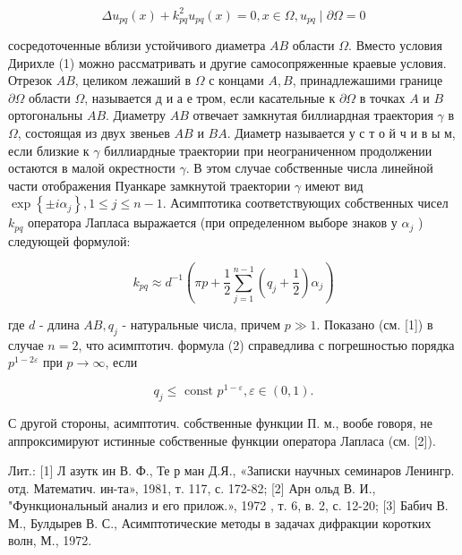 \documentclass[10pt]{article}
\begin{document}
\[

\Delta u_{p q}(x)+k_{p q}^{2} u_{p q}(x)=0, x \in \Omega, u_{p q} \mid \partial \Omega=0

\]



сосредоточенные вблизи устойчивого диаметра $A B$ области $\Omega$. Вместо условия Дирихле (1) можно рассматривать и другие самосопряженные краевые условия. Отрезок $A B$, целиком лежаший в $\Omega$ с концами $A, B$, принадлежашими границе $\partial \Omega$ области $\Omega$, называется д и а е тром, если касательные к $\partial \Omega$ в точках $A$ и $B$ ортогональны $A B$. Диаметру $A B$ отвечает замкнутая биллиардная траектория $\gamma$ в $\Omega$, состоящая из двух звеньев $A B$ и $B A$. Диаметр называется у с т о й ч и в ы м, если близкие к $\gamma$ биллиардные траектории при неограниченном продолжении остаются в малой окрестности $\gamma$. В этом случае собственные числа линейной части отображения Пуанкаре замкнутой траектории $\gamma$ имеют вид $\exp \left\{ \pm i \alpha_{j}\right\}, 1 \leqslant j \leqslant n-1$. Асимптотика соответствующих собственных чисел $k_{p q}$ оператора Лапласа выражается (при определенном выборе знаков у $\alpha_{j}$ ) следующей формулой:



\[

k_{p q} \approx d^{-1}\left(\pi p+\frac{1}{2} \sum_{j=1}^{n-1}\left(q_{j}+\frac{1}{2}\right) \alpha_{j}\right)

\]



где $d$ - длина $A B, q_{j}$ - натуральные числа, причем $p \gg 1$. Показано (см. [1]) в случае $n=2$, что асимптотич. формула (2) справедлива с погрешностью порядка $p^{1-2 \varepsilon}$ при $p \rightarrow \infty$, если



\[

q_{j} \leqslant \text { const } p^{1-\varepsilon}, \varepsilon \in(0,1) .

\]



С другой стороны, асимптотич. собственные функции П. м., вообе говоря, не аппроксимируют истинные собственные функции оператора Лапласа (см. [2]).



Лит.: [1] Л азутк ин В. Ф., Те р ман Д.Я., «Записки научных семинаров Ленингр. отд. Математич. ин-та», 1981, т. 117, с. 172-82; [2] Арн ольд В. И., "Функциональный анализ и его прилож.», 1972 , т. 6, в. 2, с. 12-20; [3] Бабич В. М., Булдырев В. С., Асимптотические методы в задачах дифракции коротких волн, М., 1972.
\end{document}
